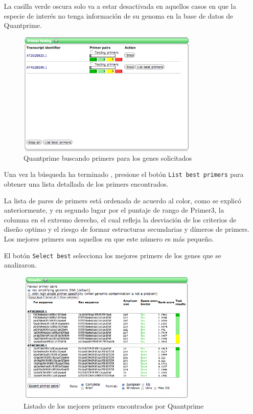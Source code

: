 \documentclass[letter,11pt]{book}
\begin{document}
La casilla verde oscura solo va a estar desactivada en aquellos casos en que la especie de interés no tenga información de su genoma en la base de datos de {\sc Quantprime}.

\begin{figure}[h!]
\centering
 \includegraphics[width=9cm]{Figs/QP_progress.png}
 \caption{\label{fig:QP_progress}{\sc Quantprime} buscando primers para los genes solicitados}
\end{figure}

Una vez la búsqueda ha terminado , presione el botón \Verb+List best primers+ para obtener una lista detallada de los primers encontrados.

La lista de pares de primers está ordenada de acuerdo al color, como se explicó anteriormente, y en segundo lugar por el puntaje de rango de Primer3, la columna en el extremo derecho, el cual refleja la desviación de los criterios de diseño optimo y el riesgo de formar estructuras secundarias y dímeros de primers. Los mejores primers son aquellos en que este número es más pequeño.

El botón \Verb+Select best+ selecciona los mejores primers de los genes que se analizaron. 

\begin{figure}[h!]
\centering
 \includegraphics[width=9cm]{Figs/QP_results.png}
 \caption{\label{fig:QP_results}Listado de los mejores primers encontrados por {\sc Quantprime}}
\end{figure}
\end{document}
